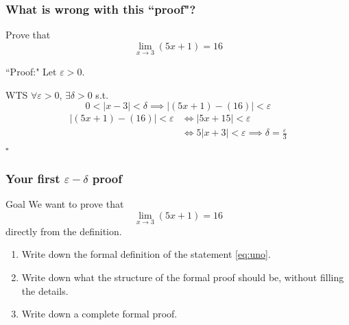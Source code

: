 \begin{frame}
	\frametitle{What is wrong with this ``proof"?}
	\fontsize{13}{13}\selectfont
	\vspace{-2mm}
	\begin{block}{}%
		Prove that
		\[
			\lim_{x\to 3}(5x+1) = 16
		\]
	\end{block}

	\begin{block}{``Proof:"}
		Let $\varepsilon>0$.

		WTS $\forall \varepsilon>0$, $\exists\delta>0$ s.t.
		\[
			0<|x-3|<\delta \implies |(5x+1) - (16)|<\varepsilon
		\]
		\vspace{-3mm}
		\begin{align*}
			|(5x+1) - (16)|<\varepsilon & \iff |5x+15|<\varepsilon                                     \\
			                            & \iff 5|x+3|<\varepsilon \implies\delta=\frac{\varepsilon}{3}
		\end{align*}
		\hfill $\square$
	\end{block}
\end{frame}

\begin{frame}[t]
	\frametitle{Your first $\varepsilon-\delta$ proof}

	\begin{block}{Goal}
		We want to prove that
		\begin{equation}
			\label{eq:uno}\lim_{x \to 3}\left( 5x + 1 \right) = 16
		\end{equation}
		directly from the definition.
	\end{block}
	\vfill
	\begin{enumerate}

		\item Write down the formal definition of the statement \eqref{eq:uno}.

		\item Write down what the structure of the formal proof should be, without
			filling the details.

		\item Write down a complete formal proof.
	\end{enumerate}
	\vfill
\end{frame}

